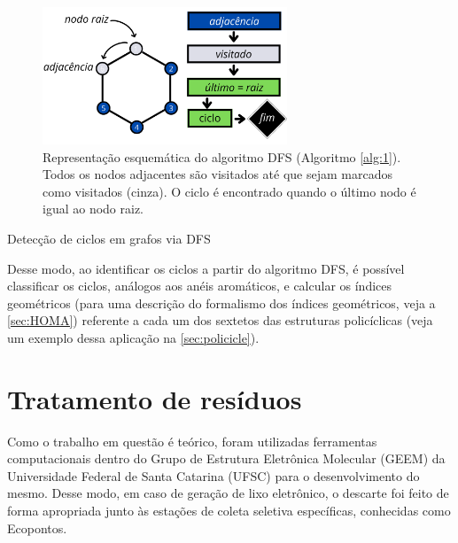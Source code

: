 \begin{figure}[htb]
\caption{\label{fig:DFS} Representação esquemática do algoritmo DFS (Algoritmo \ref{alg:1}). Todos os nodos adjacentes são visitados até que sejam marcados como visitados (cinza). O ciclo é encontrado quando o último nodo é igual ao nodo raiz.}
	\begin{center}
		\includegraphics[width=0.65\textwidth]{images/DFS.png}
	\end{center}
\end{figure}


\begin{algorithm}
\caption{Detecção de ciclos em grafos via DFS}\label{alg:1}
\LinesNumbered
{}

\end{algorithm}

Desse modo, ao identificar os ciclos a partir do algoritmo \gls{DFS}, é possível classificar os ciclos, análogos aos anéis aromáticos, e calcular os índices geométricos (para uma descrição do formalismo dos índices geométricos, veja a \autoref{sec:HOMA}) referente a cada um dos sextetos das estruturas policíclicas (veja um exemplo dessa aplicação na \autoref{sec:policicle}). 

\newpage

\section{Tratamento de resíduos}

Como o trabalho em questão é teórico, foram utilizadas ferramentas computacionais dentro do Grupo de Estrutura Eletrônica Molecular (GEEM) da Universidade Federal de Santa Catarina (UFSC) para o desenvolvimento do mesmo. Desse modo, em caso de geração de lixo eletrônico, o descarte foi feito de forma apropriada junto às estações de coleta seletiva específicas, conhecidas como Ecopontos.